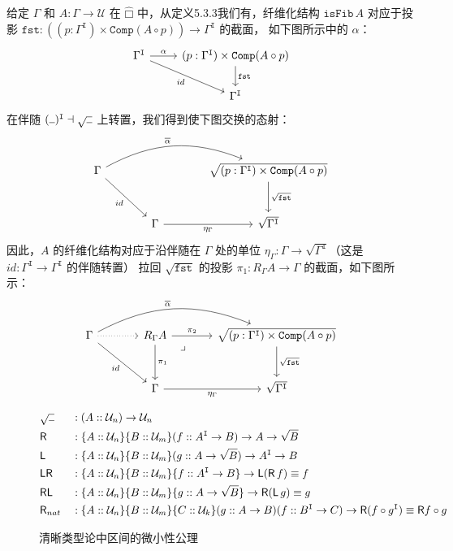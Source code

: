 \documentclass{ctexrep}
\theoremstyle{plain}
\theoremstyle{definition}
\theoremstyle{remark}
\newcommand\ttI{\mathtt{I}}
\newcommand\hatcube{\widehat{□}}
\newcommand{\ul}{{\rule[0ex]{0.5em}{0.4pt}}} %
\begin{document}
给定 $\Gamma$ 和 $A : \Gamma \to \mathcal{U}$ 在 $\hatcube$ 中，从定义5.3.3我们有，纤维化结构 
$\mathtt{isFib}\,A$ 对应于投影 $\mathtt{fst} : ((p : \Gamma^\mathtt{I}) \times \mathtt{Comp}(A \circ p)) \to \Gamma^\mathtt{I}$ 的截面，
如下图所示中的 $\alpha$：
\[
\begin{tikzcd}
\Gamma^\mathtt{I} \arrow[r, "\alpha"] \arrow[rd, " id "'] & (p : \Gamma^\mathtt{I}) \times \mathtt{Comp}(A \circ p) \arrow[d, "\mathtt{fst}"] \\
& \Gamma^\mathtt{I}
\end{tikzcd}
\]
在伴随 $(\ul)^\mathtt{I} \dashv \sqrt{\ul}$ 上转置，我们得到使下图交换的态射：
\[
\begin{tikzcd}[column sep=large, row sep=large]
\Gamma \arrow[dr, "id"'] \arrow[rr, "\overline{\alpha}", bend left=25] 
  & & \sqrt{(p : \Gamma^{\mathtt{I}}) \times \mathtt{Comp}(A \circ p)} \arrow[d, "\sqrt{\mathtt{fst}}"] \\
& \Gamma \arrow[r, "\eta_{\Gamma}"'] 
  & \sqrt{\Gamma^{\mathtt{I}}}
\end{tikzcd}
\]
因此，$A$ 的纤维化结构对应于沿伴随在 $\Gamma$ 处的单位 
$\eta_\Gamma : \Gamma \to \sqrt{\Gamma^\mathtt{I}}$（这是 $ id  : \Gamma^\mathtt{I} \to \Gamma^\mathtt{I}$ 的伴随转置）
拉回 $\sqrt{\mathtt{fst}}$ 的投影 $\pi_1 : R_\Gamma A \to \Gamma$ 的截面，如下图所示：
\[
\begin{tikzcd}[column sep=large, row sep=large]
\Gamma \arrow[r, dotted] \arrow[dr, "id"'] \arrow[rr, "\overline{\alpha}", bend left=25] 
  & R_{\Gamma}A \arrow[r, "\pi_2"] \arrow[d, "\pi_1"] \arrow[dr, phantom, "\lrcorner", very near start] 
  & \sqrt{(p : \Gamma^{\mathtt{I}}) \times \mathtt{Comp}(A \circ p)} \arrow[d, "\sqrt{\mathtt{fst}}"] \\
& \Gamma \arrow[r, "\eta_{\Gamma}"'] 
  & \sqrt{\Gamma^{\mathtt{I}}}
\end{tikzcd}
\]
\begin{figure}[htbp]
\centering
\[\begin{aligned}
& \sqrt{\ul} &&: (A :: \mathcal{U}_n) \to \mathcal{U}_n \\
& \mathsf{R} &&: \{A :: \mathcal{U}_n\}\{B :: \mathcal{U}_m\}(f :: A^{\ttI} \to B) \to A \to \sqrt{B} \\
& \mathsf{L} &&: \{A :: \mathcal{U}_n\}\{B :: \mathcal{U}_m\}(g :: A \to \sqrt{B}) \to A^{\ttI} \to B \\
& \mathsf{LR} &&: \{A :: \mathcal{U}_n\}\{B :: \mathcal{U}_m\}\{f :: A^{\ttI} \to B\} \to \mathsf{L}(\mathsf{R} \, f) \equiv f \\
& \mathsf{RL} &&: \{A :: \mathcal{U}_n\}\{B :: \mathcal{U}_m\}\{g :: A \to \sqrt{B}\} \to \mathsf{R}(\mathsf{L} \, g) \equiv g \\
& \mathsf{R}_{nat} &&: \{A :: \mathcal{U}_n\}\{B :: \mathcal{U}_m\}\{C :: \mathcal{U}_k\}(g :: A \to B)(f :: B^{\ttI} \to C) \to \mathsf{R}(f \circ g^{\ttI}) \equiv \mathsf{R}f \circ g
\end{aligned}\]
\caption{清晰类型论中区间的微小性公理}
\label{fig:tinyness_axioms}
\end{figure}
\end{document}
